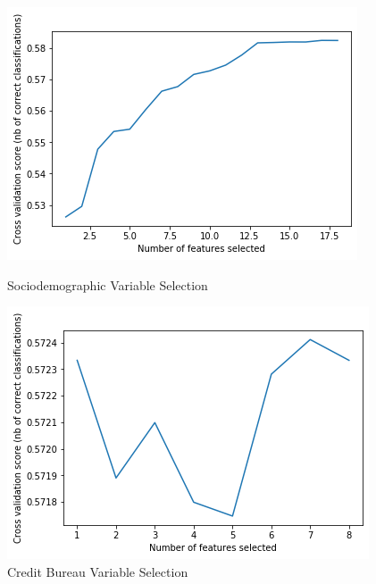 \begin{figure}[!htb]
\centering
  \begin{minipage}{0.5\textwidth}
    \includegraphics[width=\textwidth]{images/sd_only.png}
    \caption{Sociodemographic Variable Selection}
    \label{fig:sd}
  \end{minipage}%
  \begin{minipage}{0.5\textwidth}
    \includegraphics[width=\textwidth]{images/cb_only.png}
    \caption{Credit Bureau Variable Selection}
    \label{fig:cb}
  \end{minipage}
\end{figure}

\newpage

\vspace{10 pt}

